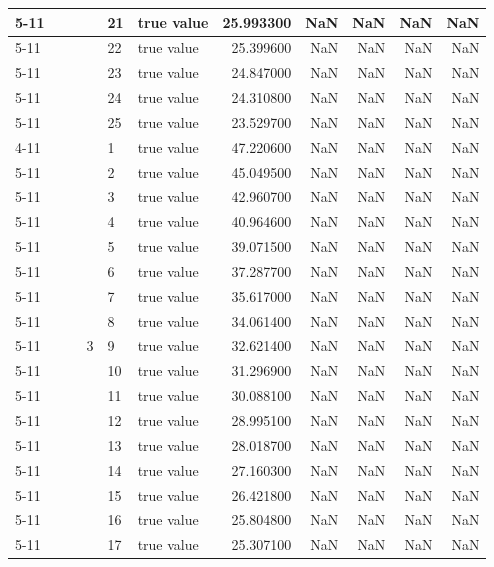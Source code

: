 \begin{tabular}{llllllrrrrr}
\cline{5-11}
 &  &  &  & 21 & true value & 25.993300 & NaN & NaN & NaN & NaN \\
\cline{5-11}
 &  &  &  & 22 & true value & 25.399600 & NaN & NaN & NaN & NaN \\
\cline{5-11}
 &  &  &  & 23 & true value & 24.847000 & NaN & NaN & NaN & NaN \\
\cline{5-11}
 &  &  &  & 24 & true value & 24.310800 & NaN & NaN & NaN & NaN \\
\cline{5-11}
 &  &  &  & 25 & true value & 23.529700 & NaN & NaN & NaN & NaN \\
\cline{4-11} \cline{5-11}
 &  &  & \multirow[t]{25}{*}{3} & 1 & true value & 47.220600 & NaN & NaN & NaN & NaN \\
\cline{5-11}
 &  &  &  & 2 & true value & 45.049500 & NaN & NaN & NaN & NaN \\
\cline{5-11}
 &  &  &  & 3 & true value & 42.960700 & NaN & NaN & NaN & NaN \\
\cline{5-11}
 &  &  &  & 4 & true value & 40.964600 & NaN & NaN & NaN & NaN \\
\cline{5-11}
 &  &  &  & 5 & true value & 39.071500 & NaN & NaN & NaN & NaN \\
\cline{5-11}
 &  &  &  & 6 & true value & 37.287700 & NaN & NaN & NaN & NaN \\
\cline{5-11}
 &  &  &  & 7 & true value & 35.617000 & NaN & NaN & NaN & NaN \\
\cline{5-11}
 &  &  &  & 8 & true value & 34.061400 & NaN & NaN & NaN & NaN \\
\cline{5-11}
 &  &  &  & 9 & true value & 32.621400 & NaN & NaN & NaN & NaN \\
\cline{5-11}
 &  &  &  & 10 & true value & 31.296900 & NaN & NaN & NaN & NaN \\
\cline{5-11}
 &  &  &  & 11 & true value & 30.088100 & NaN & NaN & NaN & NaN \\
\cline{5-11}
 &  &  &  & 12 & true value & 28.995100 & NaN & NaN & NaN & NaN \\
\cline{5-11}
 &  &  &  & 13 & true value & 28.018700 & NaN & NaN & NaN & NaN \\
\cline{5-11}
 &  &  &  & 14 & true value & 27.160300 & NaN & NaN & NaN & NaN \\
\cline{5-11}
 &  &  &  & 15 & true value & 26.421800 & NaN & NaN & NaN & NaN \\
\cline{5-11}
 &  &  &  & 16 & true value & 25.804800 & NaN & NaN & NaN & NaN \\
\cline{5-11}
 &  &  &  & 17 & true value & 25.307100 & NaN & NaN & NaN & NaN \\

\end{tabular}
